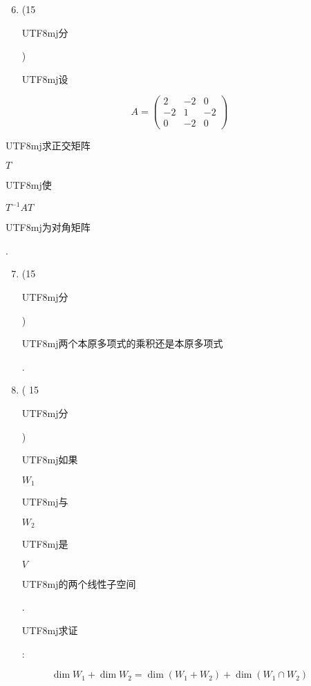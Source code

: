 \documentclass[10pt]{article}
\begin{document}
\begin{enumerate}
  \setcounter{enumi}{5}
  \item (15 \begin{CJK}{UTF8}{mj}分\end{CJK}) \begin{CJK}{UTF8}{mj}设\end{CJK}
\end{enumerate}
$$
A=\left(\begin{array}{ccc}
2 & -2 & 0 \\
-2 & 1 & -2 \\
0 & -2 & 0
\end{array}\right)
$$
\begin{CJK}{UTF8}{mj}求正交矩阵\end{CJK} $T$ \begin{CJK}{UTF8}{mj}使\end{CJK} $T^{-1} A T$ \begin{CJK}{UTF8}{mj}为对角矩阵\end{CJK}.

\begin{enumerate}
  \setcounter{enumi}{6}
  \item (15 \begin{CJK}{UTF8}{mj}分\end{CJK}) \begin{CJK}{UTF8}{mj}两个本原多项式的乘积还是本原多项式\end{CJK}.

  \item ( 15 \begin{CJK}{UTF8}{mj}分\end{CJK}) \begin{CJK}{UTF8}{mj}如果\end{CJK} $W_{1}$ \begin{CJK}{UTF8}{mj}与\end{CJK} $W_{2}$ \begin{CJK}{UTF8}{mj}是\end{CJK} $V$ \begin{CJK}{UTF8}{mj}的两个线性子空间\end{CJK}. \begin{CJK}{UTF8}{mj}求证\end{CJK}:

\end{enumerate}
$$
\operatorname{dim} W_{1}+\operatorname{dim} W_{2}=\operatorname{dim}\left(W_{1}+W_{2}\right)+\operatorname{dim}\left(W_{1} \cap W_{2}\right)
$$
\end{document}
